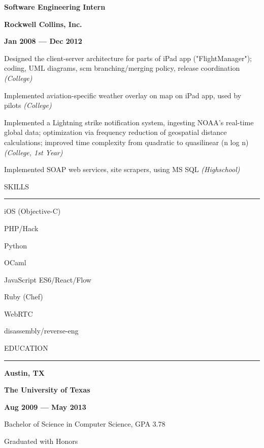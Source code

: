 \documentclass[letterpaper,11pt,oneside]{article}
\newcommand{\Heading}[1]{
  \vspace{2ex}
  \uppercase{#1} \\
  \vspace{-2ex}
  \hrule
}
\newcommand{\OneThirdBox}[1]{%
  \parbox{.333\textwidth}{#1}%
}
\newcommand{\LeftCenterRight}[4][\normalfont]{%
  \OneThirdBox{
    \begin{flushleft}%
      #1{#2}%
    \end{flushleft}%
  }%
  \OneThirdBox{
    \begin{center}%
      #1{#3}%
    \end{center}%
  }%
  \OneThirdBox{
    \begin{flushright}%
      #1{#4}%
    \end{flushright}%
  }%
}
\newenvironment{Role}[4]
{
  \LeftCenterRight[\textbf]{#1}{#2}{#3 --- #4}
  \begin{compactitem}
  \vspace{-2ex}
}
{
  \end{compactitem}
  \vspace{-1ex}
}
\begin{document}
\begin{Role}
{Software Engineering Intern}
{Rockwell Collins, Inc.}
{Jan 2008}{Dec 2012}
  \item Designed the client-server architecture for parts of iPad app
    ("FlightManager"); coding, UML diagrams, scm branching/merging policy,
    release coordination \emph{(College)}
  \item Implemented aviation-specific weather overlay on map on iPad app, used
    by pilots \emph{(College)}
  \item Implemented a Lightning strike notification system, ingesting NOAA's
    real-time global data; optimization via frequency reduction of geospatial
    distance calculations; improved time complexity from quadratic to
    quasilinear (n log n) \emph{(College, 1st Year)}
  \item Implemented SOAP web services, site scrapers, using MS SQL
    \emph{(Highschool)}
\end{Role}


\Heading{Skills}
\vspace{2ex}
\begin{multicols}{3}
\small
\begin{compactitem}
  \item iOS (Objective-C)
  \item PHP/Hack
  \item Python
  \item OCaml
  \item JavaScript ES6/React/Flow
  \item Ruby (Chef)
  \item WebRTC
  \item disassembly/reverse-eng
\end{compactitem}
\normalsize
\end{multicols}


\Heading{Education}

\begin{Role}
  {Austin, TX}
  {The University of Texas}
  {Aug 2009}
  {May 2013}
  \item Bachelor of Science in Computer Science, GPA 3.78
  \item Graduated with Honors
\end{Role}
\end{document}
